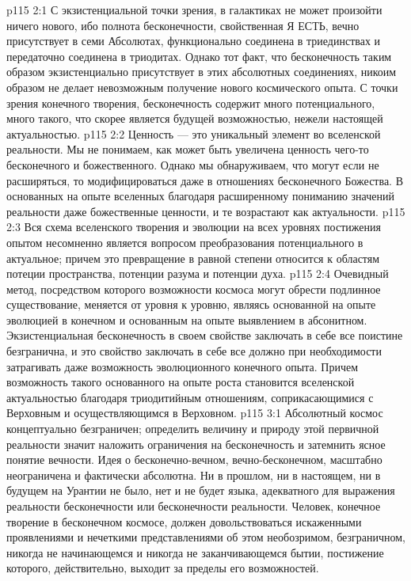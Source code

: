 \vs p115 2:1 С экзистенциальной точки зрения, в галактиках не может произойти ничего нового, ибо полнота бесконечности, свойственная Я ЕСТЬ, вечно присутствует в семи Абсолютах, функционально соединена в триединствах и передаточно соединена в триодитах. Однако тот факт, что бесконечность таким образом экзистенциально присутствует в этих абсолютных соединениях, никоим образом не делает невозможным получение нового космического опыта. С точки зрения конечного творения, бесконечность содержит много потенциального, много такого, что скорее является будущей возможностью, нежели настоящей актуальностью.
\vs p115 2:2 Ценность --- это уникальный элемент во вселенской реальности. Мы не понимаем, как может быть увеличена ценность чего\hyp{}то бесконечного и божественного. Однако мы обнаруживаем, что  могут если не расширяться, то модифицироваться даже в отношениях бесконечного Божества. В основанных на опыте вселенных благодаря расширенному пониманию значений реальности даже божественные ценности, и те возрастают как актуальности.
\vs p115 2:3 Вся схема вселенского творения и эволюции на всех уровнях постижения опытом несомненно является вопросом преобразования потенциального в актуальное; причем это превращение в равной степени относится к областям потеции пространства, потенции разума и потенции духа.
\vs p115 2:4 Очевидный метод, посредством которого возможности космоса могут обрести подлинное существование, меняется от уровня к уровню, являясь основанной на опыте эволюцией в конечном и основанным на опыте выявлением в абсонитном. Экзистенциальная бесконечность в своем свойстве заключать в себе все поистине безгранична, и это свойство заключать в себе все должно при необходимости затрагивать даже возможность эволюционного конечного опыта. Причем возможность такого основанного на опыте роста становится вселенской актуальностью благодаря триодитийным отношениям, соприкасающимися с Верховным и осуществляющимся в Верховном.
\vs p115 3:1 Абсолютный космос концептуально безграничен; определить величину и природу этой первичной реальности значит наложить ограничения на бесконечность и затемнить ясное понятие вечности. Идея о бесконечно\hyp{}вечном, вечно\hyp{}бесконечном, масштабно неограничена и фактически абсолютна. Ни в прошлом, ни в настоящем, ни в будущем на Урантии не было, нет и не будет языка, адекватного для выражения реальности бесконечности или бесконечности реальности. Человек, конечное творение в бесконечном космосе, должен довольствоваться искаженными проявлениями и нечеткими представлениями об этом необозримом, безграничном, никогда не начинающемся и никогда не заканчивающемся бытии, постижение которого, действительно, выходит за пределы его возможностей.
